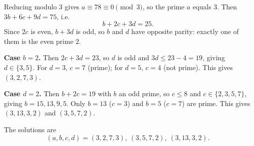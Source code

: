 Reducing modulo $3$ gives $a\equiv 78\equiv0\pmod 3$, so the prime $a$ equals $3$. Then $3b+6c+9d=75$, i.e.
\[
b+2c+3d=25 .
\]
Since $2c$ is even, $b+3d$ is odd, so $b$ and $d$ have opposite parity: exactly one of them is the even prime $2$.

\textbf{Case $b=2$.} Then $2c+3d=23$, so $d$ is odd and $3d\le23-4=19$, giving $d\in\{3,5\}$. For $d=3$, $c=7$ (prime); for $d=5$, $c=4$ (not prime). This gives $(3,2,7,3)$.

\textbf{Case $d=2$.} Then $b+2c=19$ with $b$ an odd prime, so $c\le8$ and $c\in\{2,3,5,7\}$, giving $b=15,13,9,5$. Only $b=13$ ($c=3$) and $b=5$ ($c=7$) are prime. This gives $(3,13,3,2)$ and $(3,5,7,2)$.

The solutions are
\[
\boxed{(a,b,c,d)=(3,2,7,3),\ (3,5,7,2),\ (3,13,3,2)} .
\]
